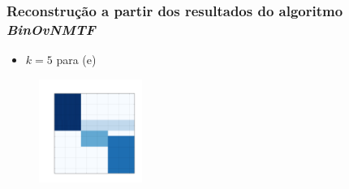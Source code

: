 \documentclass[10pt]{beamer}
\begin{document}
\begin{frame}
\frametitle{Reconstrução a partir dos resultados do algoritmo \textit{BinOvNMTF}}

  \begin{itemize}
    \item $k = 5$ para (e)
  \end{itemize}

  \begin{figure}[H]
  \centering
      \includegraphics[width=0.3\textwidth]{img/e-reconstruction-2-binovnmtf.png}
  \end{figure}

\end{frame}


\end{document}
